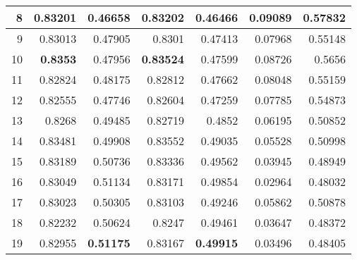 \documentclass[11pt]{article}
\begin{document}
\begin{table}
\begin{tabular}{|r|r|r|r|r|r|r|}
\hline
8                               & 0.83201                    & 0.46658                 & 0.83202                       & 0.46466                    & 0.09089                  & 0.57832                 \\ 
\hline
9                               & 0.83013                    & 0.47905                 & 0.8301                        & 0.47413                    & 0.07968                  & 0.55148                 \\ 
\hline
10                              & \textbf{0.8353}                     & 0.47956                 & \textbf{0.83524}                       & 0.47599                    & 0.08726                  & 0.5656                  \\ 
\hline
11                              & 0.82824                    & 0.48175                 & 0.82812                       & 0.47662                    & 0.08048                  & 0.55159                 \\ 
\hline
12                              & 0.82555                    & 0.47746                 & 0.82604                       & 0.47259                    & 0.07785                  & 0.54873                 \\ 
\hline
13                              & 0.8268                     & 0.49485                 & 0.82719                       & 0.4852                     & 0.06195                  & 0.50852                 \\ 
\hline
14                              & 0.83481                    & 0.49908                 & 0.83552                       & 0.49035                    & 0.05528                  & 0.50998                 \\ 
\hline
15                              & 0.83189                    & 0.50736                 & 0.83336                       & 0.49562                    & 0.03945                  & 0.48949                 \\ 
\hline
16                              & 0.83049                    & 0.51134                 & 0.83171                       & 0.49854                    & 0.02964                  & 0.48032                 \\ 
\hline
17                              & 0.83023                    & 0.50305                 & 0.83103                       & 0.49246                    & 0.05862                  & 0.50878                 \\ 
\hline
18                              & 0.82232                    & 0.50624                 & 0.8247                        & 0.49461                    & 0.03647                  & 0.48372                 \\ 
\hline
19                              & 0.82955                    & \textbf{0.51175}                 & 0.83167                       & \textbf{0.49915}                    & 0.03496                  & 0.48405                 \\
\hline


\end{tabular}
\end{table}
\end{document}
